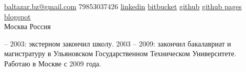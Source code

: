 \documentclass[unicode, 10pt, a4paper, oneside, fleqn]{article}
\begin{document}
\sloppy  %


\nobreakvspace{0.3em}  %

\noindent\href{mailto:baltazar.dot.bz.at.gmail.dot.com}{baltazar.bz\mbox{}@\mbox{}gmail.com}\sbull
\textsmaller{+}79853037426\sbull
\href{http://ru.linkedin.com/pub/yuri-bochkarev/21/3a9/555}{linkedin}
\sbull
\href{https://bitbucket.org/balta2ar}{bitbucket}
\sbull
\href{https://github.com/balta2ar}{github}
\sbull
\href{http://balta2ar.github.com}{github pages}
\sbull
\href{http://baltazar-bz.blogspot.com/}{blogspot}
\\
Москва\sbull
Россия
\spacedhrule{0.8em}{-0.4em}  %


\vspace{0em}  %

 -- 2003: экстерном закончил школу. 2003 -- 2009: закончил бакалавриат и
магистратуру в Ульяновском Государственном Техническом Университете. Работаю в
Москве с 2009 года.
\spacedhrule{0.6em}{-0.4em}

\end{document}
